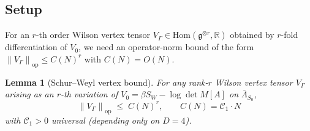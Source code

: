 \documentclass[11pt,a4paper]{amsart}
\newtheorem{lemma}[theorem]{Lemma}
\theoremstyle{definition}
\newcommand{\R}{\mathbb{R}}
\newcommand{\norm}[1]{\left\lVert#1\right\rVert}
\begin{document}
\subsection{Setup}

For an $r$-th order Wilson vertex tensor
$V_\Gamma \in \mathrm{Hom}(\mathfrak g^{\otimes r}, \R)$ obtained by
$r$-fold differentiation of $V_0$, we need an operator-norm bound
of the form $\norm{V_\Gamma}_{\mathrm{op}} \leq C(N)^r$ with
$C(N) = O(N)$.

\begin{lemma}[Schur--Weyl vertex bound]\label{lem:vertex}
For any rank-$r$ Wilson vertex tensor $V_\Gamma$ arising as an $r$-th
variation of $V_0 = \beta S_W - \log\det M[A]$ on $\overline\Lambda_{S_0}$,
\begin{equation}\label{eq:vertex-bound}
\norm{V_\Gamma}_{\mathrm{op}} \;\leq\; C(N)^r,
\qquad C(N) = \mathcal C_1 \cdot N
\end{equation}
with $\mathcal C_1 > 0$ universal (depending only on $D = 4$).
\end{lemma}
\end{document}
